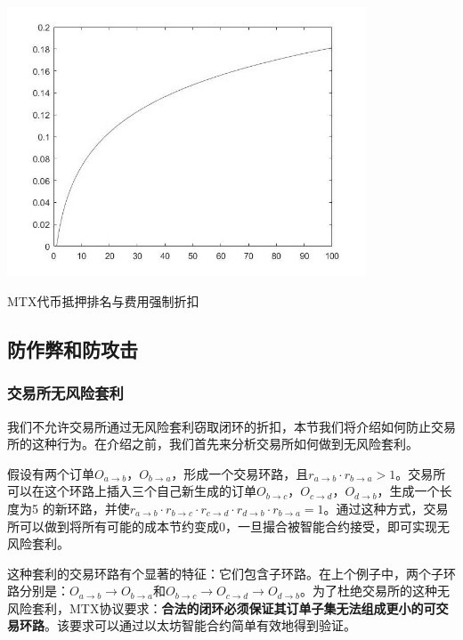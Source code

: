 \documentclass[UTF8,nofonts]{ctexart}
\makeatletter
\newenvironment{figurehere}
  {\def\@captype{figure}}
  {}
\makeatother
\begin{document}
\begin{center}
\begin{figurehere}
\includegraphics[height=8cm]{images/exchange-discount.png}
\caption{MTX代币抵押排名与费用强制折扣}
\label{fig:mtxprotocol}
\end{figurehere}
\end{center}

\subsection{防作弊和防攻击}

\subsubsection{交易所无风险套利}
我们不允许交易所通过无风险套利窃取闭环的折扣，本节我们将介绍如何防止交易所的这种行为。在介绍之前，我们首先来分析交易所如何做到无风险套利。

假设有两个订单$O_{a\rightarrow b}$，$O_{b\rightarrow a}$，形成一个交易环路，且$r_{a\rightarrow b} \cdot r_{b\rightarrow a} > 1$。交易所可以在这个环路上插入三个自己新生成的订单$O_{b\rightarrow c}$，$O_{c\rightarrow d}$，$O_{d\rightarrow b}$，生成一个长度为5
的新环路，并使$r_{a\rightarrow b}  \cdot r_{b\rightarrow c} \cdot r_{c\rightarrow d}\cdot r_{d\rightarrow b}\cdot r_{b\rightarrow a}  = 1$。通过这种方式，交易所可以做到将所有可能的成本节约变成0，一旦撮合被智能合约接受，即可实现无风险套利。

这种套利的交易环路有个显著的特征：它们包含子环路。在上个例子中，两个子环路分别是：$O_{a\rightarrow b}\rightarrow O_{b\rightarrow a}$和$O_{b\rightarrow c}\rightarrow O_{c\rightarrow d}\rightarrow O_{d\rightarrow b}$。为了杜绝交易所的这种无风险套利，MTX协议要求：{\bfseries 合法的闭环必须保证其订单子集无法组成更小的可交易环路}。该要求可以通过以太坊智能合约简单有效地得到验证。
\end{document}
